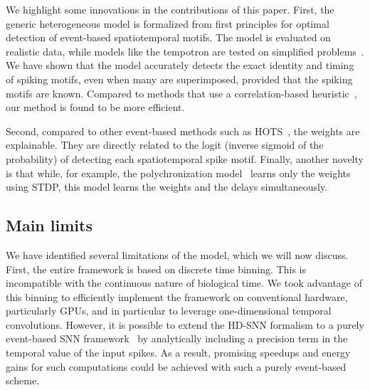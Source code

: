 \documentclass[runningheads]{llncs}
\newcommand{\ms}{\si{\milli\second}}%
\begin{document}
We highlight some innovations in the contributions of this paper. First, the generic heterogeneous model is formalized from first principles for optimal detection of event-based spatiotemporal motifs. The model is evaluated on realistic data, while models like the tempotron are tested on simplified problems~\cite{gutig_tempotron_2006}. We have shown that the model accurately detects the exact identity and timing of spiking motifs, even when many are superimposed, provided that the spiking motifs are known. Compared to methods that use a correlation-based heuristic~\cite{ghosh_spatiotemporal_2019,yu_stsc-snn_2022}, our method is found to be more efficient. 

Second, compared to other event-based methods such as HOTS~\cite{lagorce_hots_2017}, the weights are explainable. They are directly related to the logit (inverse sigmoid of the probability) of detecting each spatiotemporal spike motif. Finally, another novelty is that while, for example, the polychronization model~\cite{izhikevich_polychronization_2006} learns only the weights using STDP, this model learns the weights and the delays simultaneously.%

\subsection{Main limits}
We have identified several limitations of the model, which we will now discuss. First, the entire framework is based on discrete time binning. This is incompatible with the continuous nature of biological time. We took advantage of this binning to efficiently implement the framework on conventional hardware, particularly GPUs, and in particular to leverage one-dimensional temporal convolutions.
However, it is possible to extend the HD-SNN formalism to a purely event-based SNN framework~\cite{grimaldi_robust_2022} by analytically including a precision term in the temporal value of the input spikes. As a result, promising speedups and energy gains for such computations could be achieved with such a purely event-based scheme.
\end{document}
